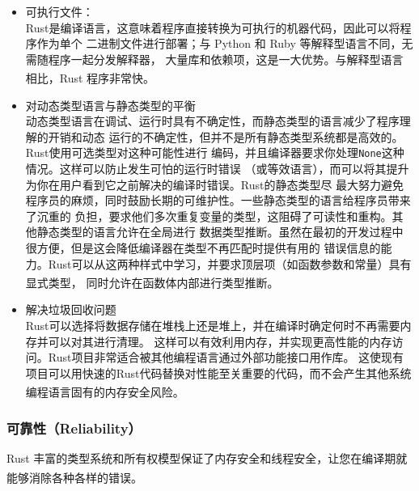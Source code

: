 \documentclass[UTF8,fontset=none,linespread=1.15]{ctexart}
\let\nosupcite\cite
\renewcommand*{\cite}[1]{\textsuperscript{\nosupcite{#1}}}
\begin{document}
\begin{itemize}
\item 可执行文件：\\
  Rust是编译语言，这意味着程序直接转换为可执行的机器代码，因此可以将程序作为单个
  二进制文件进行部署；与 Python 和 Ruby 等解释型语言不同，无需随程序一起分发解释器，
  大量库和依赖项，这是一大优势。与解释型语言相比，Rust 程序非常快。\cite{bib:4-rust-go-cmp}

\item 对动态类型语言与静态类型的平衡\\
  动态类型语言在调试、运行时具有不确定性，而静态类型的语言减少了程序理解的开销和动态
  运行的不确定性，但并不是所有静态类型系统都是高效的。Rust使用可选类型对这种可能性进行
  编码，并且编译器要求你处理\texttt{None}这种情况。这样可以防止发生可怕的运行时错误
  （或等效语言），而可以将其提升为你在用户看到它之前解决的编译时错误。Rust的静态类型尽
  最大努力避免程序员的麻烦，同时鼓励长期的可维护性。一些静态类型的语言给程序员带来了沉重的
  负担，要求他们多次重复变量的类型，这阻碍了可读性和重构。其他静态类型的语言允许在全局进行
  数据类型推断。虽然在最初的开发过程中很方便，但是这会降低编译器在类型不再匹配时提供有用的
  错误信息的能力。Rust可以从这两种样式中学习，并要求顶层项（如函数参数和常量）具有显式类型，
  同时允许在函数体内部进行类型推断。\cite{bib:3-why-rust-pop}

\item 解决垃圾回收问题\\
  Rust可以选择将数据存储在堆栈上还是堆上，并在编译时确定何时不再需要内存并可以对其进行清理。
  这样可以有效利用内存，并实现更高性能的内存访问。Rust项目非常适合被其他编程语言通过外部功能接口用作库。
  这使现有项目可以用快速的Rust代码替换对性能至关重要的代码，而不会产生其他系统编程语言固有的内存安全风险。
  \cite{bib:3-why-rust-pop}
\end{itemize}

\subsubsection{可靠性（Reliability）}

Rust 丰富的类型系统和所有权模型保证了内存安全和线程安全，让您在编译期就能够消除各种各样的错误。\cite{bib:1-rust-lang}
\end{document}

